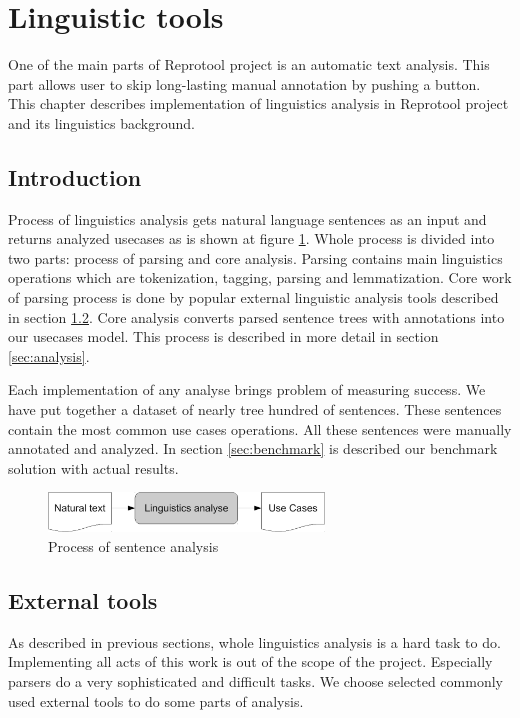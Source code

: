 \section{Linguistic tools}

One of the main parts of Reprotool project is an automatic text analysis. This part allows user to skip long-lasting manual annotation by pushing a button. This chapter describes implementation of linguistics analysis in Reprotool project and its linguistics background.

\subsection{Introduction}
Process of linguistics analysis gets natural language sentences as an input and returns analyzed usecases as is shown at figure \ref{fig:LinguisticsAnalyseSmall}. Whole process is divided into two parts: process of parsing and core analysis. Parsing contains main linguistics operations which are tokenization, tagging, parsing and lemmatization. Core work of parsing process is done by popular external linguistic analysis tools described in section \ref{sec:externaltools}. Core analysis converts parsed sentence trees with annotations into our usecases model. This process is described in more detail in section \ref{sec:analysis}. %

Each implementation of any analyse brings problem of measuring success. We have put together a dataset of nearly tree hundred of sentences. These sentences contain the most common use cases operations. All these sentences were manually annotated and analyzed. In section \ref{sec:benchmark} is described our benchmark solution with actual results.

\begin{figure}[ht]
  \centering
  \includegraphics[height=30pt]{images/LinguisticsAnalyseSmall}
  \caption{Process of sentence analysis}
  \label{fig:LinguisticsAnalyseSmall}
\end{figure}

\subsection{External tools}
\label{sec:externaltools}
As described in previous sections, whole linguistics analysis is a hard task to do. Implementing all acts of this work is out of the scope of the project.  Especially parsers do a very sophisticated and difficult tasks. We choose selected commonly used external tools to do some parts of analysis. 

